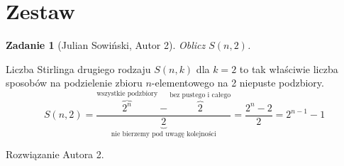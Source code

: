 \documentclass{mwart}
\newtheorem{zad}{Zadanie}[section]
\begin{document}
\newpage
\section{Zestaw}          %

\begin{zad}[Julian Sowiński, Autor 2]
    Oblicz $S(n, 2)$.
\end{zad}
\begin{mdframed}
    Liczba Stirlinga drugiego rodzaju $S(n, k)$ dla $k=2$ to tak właściwie liczba sposobów na podzielenie zbioru $n$-elementowego na 2 niepuste podzbiory.
    $$S(n, 2) = \frac{\overbrace{2^n}^{\text{wszystkie podzbiory}} - \overbrace{2}^{\text{bez pustego i całego}}}{\underbrace{2}_{\text{nie bierzemy pod uwagę kolejności}}} = \frac{2^n - 2}{2} = 2^{n-1} - 1$$
\end{mdframed}
\begin{mdframed}
    Rozwiązanie Autora 2.
\end{mdframed}
\end{document}
